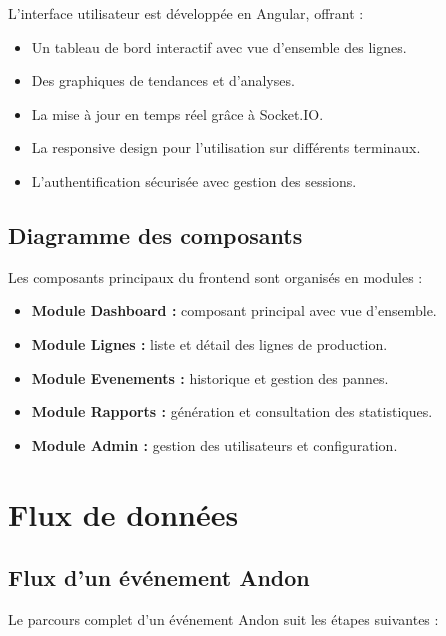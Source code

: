 L'interface utilisateur est d\'evelopp\'ee en Angular, offrant :

\begin{itemize}
    \item Un tableau de bord interactif avec vue d'ensemble des lignes.
    \item Des graphiques de tendances et d'analyses.
    \item La mise \`a jour en temps r\'eel gr\^ace \`a Socket.IO.
    \item La responsive design pour l'utilisation sur diff\'erents terminaux.
    \item L'authentification s\'ecuris\'ee avec gestion des sessions.
\end{itemize}

\subsection{Diagramme des composants}

Les composants principaux du frontend sont organis\'es en modules :

\begin{itemize}
    \item \textbf{Module Dashboard :} composant principal avec vue d'ensemble.
    \item \textbf{Module Lignes :} liste et d\'etail des lignes de production.
    \item \textbf{Module Evenements :} historique et gestion des pannes.
    \item \textbf{Module Rapports :} g\'en\'eration et consultation des statistiques.
    \item \textbf{Module Admin :} gestion des utilisateurs et configuration.
\end{itemize}

\section{Flux de donn\'ees}

\subsection{Flux d'un \'ev\'enement Andon}

Le parcours complet d'un \'ev\'enement Andon suit les \'etapes suivantes :

